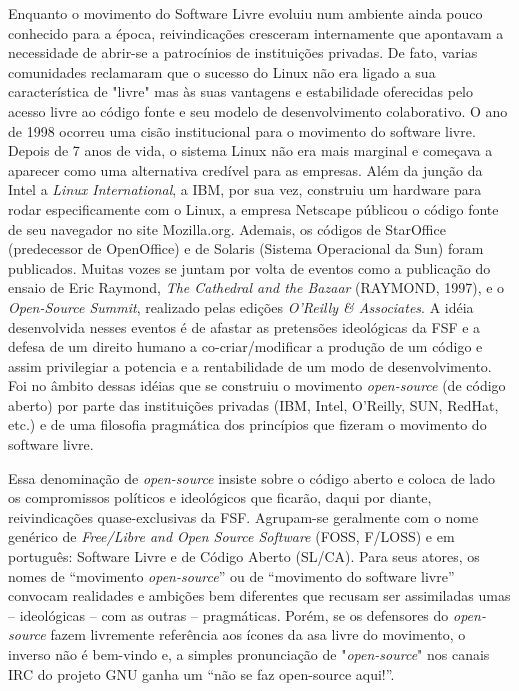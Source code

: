 Enquanto o movimento do Software Livre evoluiu num ambiente ainda pouco conhecido para a época, reivindicações cresceram internamente que apontavam a necessidade de abrir-se a patrocínios de instituições privadas. De fato, varias comunidades reclamaram que o sucesso do Linux não era ligado a sua característica de "livre" mas às suas vantagens e estabilidade oferecidas pelo acesso livre ao código fonte e seu modelo de desenvolvimento colaborativo. O ano de 1998 ocorreu uma cisão institucional para o movimento do software livre. Depois de 7 anos de vida, o sistema Linux não era mais marginal e começava a aparecer como uma alternativa credível para as empresas. Além da junção da Intel a \emph{Linux International}, a IBM, por sua vez, construiu um hardware para rodar especificamente com o Linux,  a empresa Netscape públicou o código fonte de seu navegador no site Mozilla.org. Ademais, os códigos de StarOffice (predecessor de OpenOffice) e de Solaris (Sistema Operacional da Sun) foram publicados. Muitas vozes se juntam por volta de eventos como a publicação do ensaio de Eric Raymond, \emph{The Cathedral and the Bazaar} (RAYMOND, 1997), e o \emph{Open-Source Summit}, realizado pelas edições \emph{O’Reilly \& Associates}. A idéia desenvolvida nesses eventos é de afastar as pretensões ideológicas da FSF e a defesa de um direito humano a co-criar/modificar a produção de um código e assim privilegiar a potencia e a rentabilidade de um modo de desenvolvimento. Foi no âmbito dessas idéias que se construiu o movimento \emph{open-source} (de código aberto) por parte das instituições privadas (IBM, Intel, O’Reilly, SUN, RedHat, etc.) e de uma filosofia pragmática dos princípios que fizeram o movimento do software livre.

Essa denominação de \emph{open-source} insiste sobre o código aberto e coloca de lado os compromissos políticos e ideológicos que ficarão, daqui por diante, reivindicações quase-exclusivas da FSF. Agrupam-se geralmente com o nome genérico de \emph{Free/Libre and Open Source Software} (FOSS, F/LOSS) e em português: Software Livre e de Código Aberto (SL/CA). Para seus atores, os nomes de “movimento \emph{open-source}” ou de “movimento do software livre” convocam realidades e ambições bem diferentes que recusam ser assimiladas umas – ideológicas – com as outras – pragmáticas. Porém, se os defensores do \emph{open-source} fazem livremente referência aos ícones da asa livre do movimento, o inverso não é bem-vindo e, a simples pronunciação de "\emph{open-source}" nos canais IRC do projeto GNU ganha um “não se faz open-source aqui!”.

